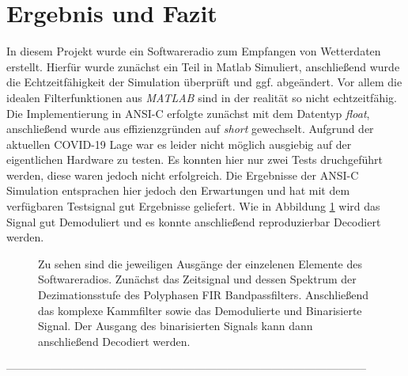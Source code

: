 \documentclass{article}
\begin{document}
\section{Ergebnis und Fazit}
In diesem Projekt wurde ein Softwareradio zum Empfangen von Wetterdaten erstellt. Hierfür wurde zunächst 
ein Teil in Matlab Simuliert, anschließend wurde die Echtzeitfähigkeit der Simulation überprüft und ggf. 
abgeändert. Vor allem die idealen Filterfunktionen aus \textit{MATLAB} sind in der realität so nicht echtzeitfähig.
Die Implementierung in ANSI-C erfolgte zunächst mit dem Datentyp \textit{float}, anschließend wurde aus effizienzgründen auf \textit{short}
gewechselt. Aufgrund der aktuellen COVID-19 Lage war es leider nicht möglich ausgiebig auf der eigentlichen Hardware zu testen.
Es konnten hier nur zwei Tests druchgeführt werden, diese waren jedoch nicht erfolgreich. 
Die Ergebnisse der ANSI-C Simulation entsprachen hier jedoch den Erwartungen und hat mit dem verfügbaren Testsignal gut 
Ergebnisse geliefert. Wie in Abbildung \ref{fig:result} wird das Signal gut Demoduliert und es konnte anschließend
reproduzierbar Decodiert werden.

\begin{figure}[!h]
    \label{fig:result}
    \centering
    \def\svgscale{0.3}
    \def\svgwidth{\columnwidth}
    
    \caption{Zu sehen sind die jeweiligen Ausgänge der einzelenen Elemente des Softwareradios. Zunächst das Zeitsignal und dessen 
    Spektrum der Dezimationsstufe des Polyphasen FIR Bandpassfilters. Anschließend das komplexe Kammfilter sowie das Demodulierte 
    und Binarisierte Signal. Der Ausgang des binarisierten Signals kann dann anschließend Decodiert werden.}
\end{figure}



--------------------------------------------------------------------------------------------------






\end{document}
